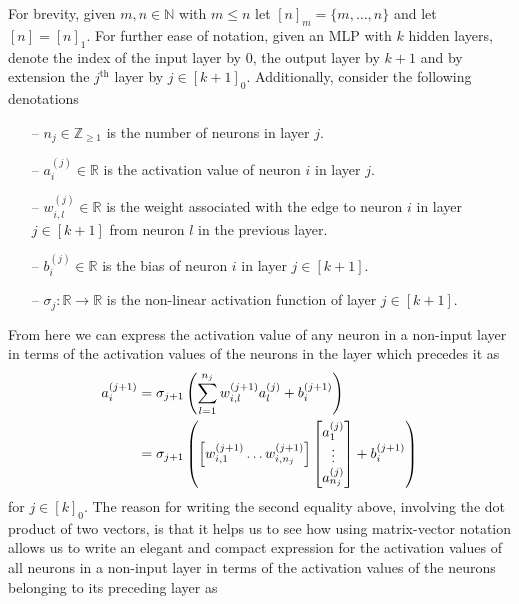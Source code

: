 \documentclass[11pt]{article}
\begin{document}
For brevity, given $m,n\in\mathbb{N}$ with $m\leq n$ let $[n]_m=\{m,\dots,n\}$ and let $[n]=[n]_1$. For further ease of notation, given an MLP with $k$ hidden layers, denote the index of the input layer by $0$, the output layer by $k+1$ and by extension the $j^{\text{th}}$ layer by $j\in[k+1]_0$. Additionally, consider the following denotations
\begin{itemize}
    \item[--] $n_j\in\mathbb{Z}_{\geq1}$ is the number of neurons in layer $j$.
    \item[--] $a_i^{(j)}\in\mathbb{R}$ is the activation value of neuron $i$ in layer $j$.
    \item[--] $w_{i,l}^{(j)}\in\mathbb{R}$ is the weight associated with the edge to neuron $i$ in layer $j\in[k+1]$ from neuron $l$ in the previous layer.
    \item[--] $b_i^{(j)}\in\mathbb{R}$ is the bias of neuron $i$ in layer $j\in[k+1]$.
    \item[--] $\sigma_j:\mathbb{R}\rightarrow\mathbb{R}$ is the non-linear activation function of layer $j\in[k+1]$.
\end{itemize}
From here we can express the activation value of any neuron in a non-input layer in terms of the activation values of the neurons in the layer which precedes it as
\begin{align*}
    a_i^{(j+1)}
    &=
    \sigma_{j+1}\left(
    \sum_{l=1}^{n_j} w_{i,l}^{(j+1)}a_l^{(j)} + b_i^{(j+1)}
    \right)\\
    &=
    \sigma_{j+1}\left(
    \left[w_{i,1}^{(j+1)} \dots w_{i,n_j}^{(j+1)}\right]
    \begin{bmatrix}
        a_1^{(j)}\\
        \vdots\\
        a_{n_j}^{(j)}
    \end{bmatrix}
    +
    b_i^{(j+1)}
\right)
\end{align*}
for $j\in[k]_0$. The reason for writing the second equality above, involving the dot product of two vectors, is that it helps us to see how using matrix-vector notation allows us to write an elegant and compact expression for the activation values of all neurons in a non-input layer in terms of the activation values of the neurons belonging to its preceding layer as
\end{document}
